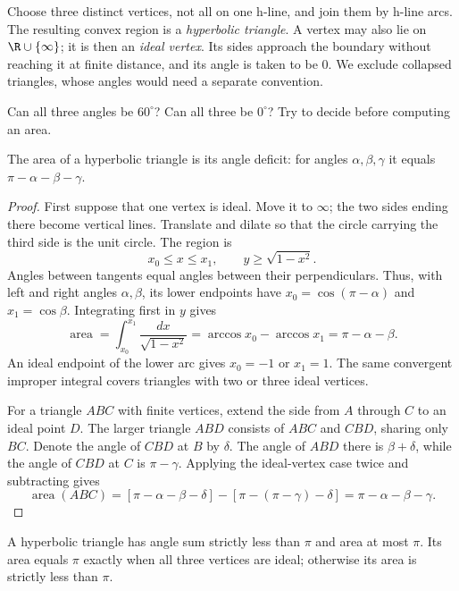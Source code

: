 Choose three distinct vertices, not all on one h-line, and join them by h-line arcs. The resulting convex region is a \emph{hyperbolic triangle}. A vertex may also lie on $\R\cup\{\infty\}$; it is then an \emph{ideal vertex}. Its sides approach the boundary without reaching it at finite distance, and its angle is taken to be $0$. We exclude collapsed triangles, whose angles would need a separate convention.

\begin{think}
Can all three angles be $60^\circ$? Can all three be $0^\circ$? Try to decide before computing an area.
\end{think}

\begin{theorem}\label{geometry:thm:hyparea}
The area of a hyperbolic triangle is its angle deficit: for angles $\alpha,\beta,\gamma$ it equals $\pi-\alpha-\beta-\gamma$.
\end{theorem}

\begin{proof}
First suppose that one vertex is ideal. Move it to $\infty$; the two sides ending there become vertical lines. Translate and dilate so that the circle carrying the third side is the unit circle. The region is
\[
x_0\le x\le x_1,\qquad y\ge\sqrt{1-x^2}.
\]
Angles between tangents equal angles between their perpendiculars. Thus, with left and right angles $\alpha,\beta$, its lower endpoints have $x_0=\cos(\pi-\alpha)$ and $x_1=\cos\beta$. Integrating first in $y$ gives
\[
\operatorname{area}=\int_{x_0}^{x_1}\frac{dx}{\sqrt{1-x^2}}
=\arccos x_0-\arccos x_1=\pi-\alpha-\beta.
\]
An ideal endpoint of the lower arc gives $x_0=-1$ or $x_1=1$. The same convergent improper integral covers triangles with two or three ideal vertices.

For a triangle $ABC$ with finite vertices, extend the side from $A$ through $C$ to an ideal point $D$. The larger triangle $ABD$ consists of $ABC$ and $CBD$, sharing only $BC$. Denote the angle of $CBD$ at $B$ by $\delta$. The angle of $ABD$ there is $\beta+\delta$, while the angle of $CBD$ at $C$ is $\pi-\gamma$. Applying the ideal-vertex case twice and subtracting gives
\[
\operatorname{area}(ABC)
=[\pi-\alpha-\beta-\delta]-[\pi-(\pi-\gamma)-\delta]
=\pi-\alpha-\beta-\gamma.
\]
\end{proof}

\begin{corollary}\label{geometry:cor:anglesum}
A hyperbolic triangle has angle sum strictly less than $\pi$ and area at most $\pi$. Its area equals $\pi$ exactly when all three vertices are ideal; otherwise its area is strictly less than $\pi$.
\end{corollary}

